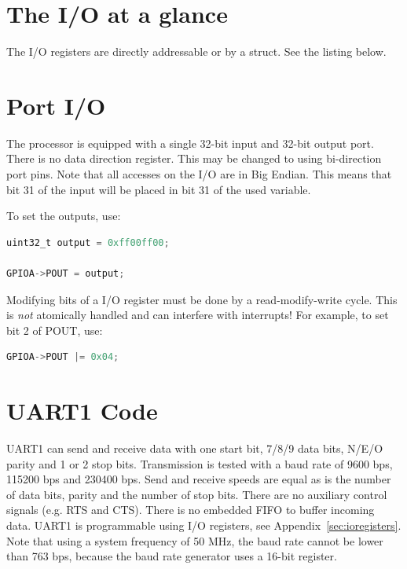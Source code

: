\documentclass[12pt]{article}
\begin{document}
\section{The I/O at a glance}

The I/O registers are directly addressable or by a struct. See the listing below.



\section{Port I/O}
The processor is equipped with a single 32-bit input and 32-bit output port. There is no data direction register. This may be changed to using bi-direction port pins. Note that all accesses on the I/O are in Big Endian. This means that bit 31 of the input will be placed in bit 31 of the used variable.

To set the outputs, use:

\begin{lstlisting}[language=C]
uint32_t output = 0xff00ff00;

GPIOA->POUT = output;
\end{lstlisting}

Modifying bits of a I/O register must be done by a read-modify-write cycle. This is \emph{not} atomically handled and can interfere with interrupts! For example, to set bit 2 of POUT, use:

\begin{lstlisting}[language=C]
GPIOA->POUT |= 0x04;
\end{lstlisting}

\section{UART1 Code}

UART1 can send and receive data with one start bit, 7/8/9 data bits, N/E/O parity and 1 or 2 stop bits. Transmission is tested with a baud rate of 9600 bps, 115200 bps and 230400 bps. Send and receive speeds are equal as is the number of data bits, parity and the number of stop bits. There are no auxiliary control signals (e.g. RTS and CTS). There is no embedded FIFO to buffer incoming data. UART1 is programmable using I/O registers, see Appendix~\ref{sec:ioregisters}. Note that using a system frequency of 50 MHz, the baud rate cannot be lower than 763 bps, because the baud rate generator uses a 16-bit register.
\end{document}
